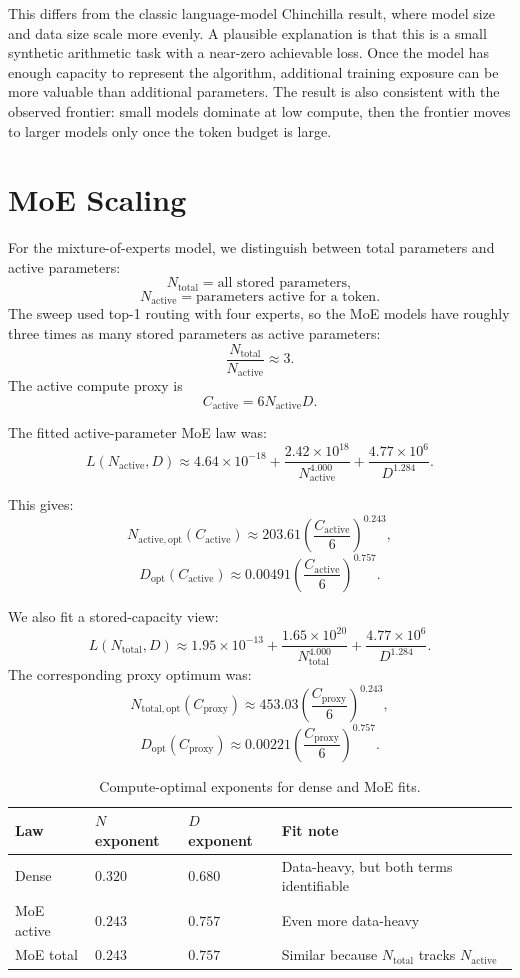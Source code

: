 \documentclass[11pt]{article}
\begin{document}
This differs from the classic language-model Chinchilla result, where model
size and data size scale more evenly. A plausible explanation is that this is
a small synthetic arithmetic task with a near-zero achievable loss. Once the
model has enough capacity to represent the algorithm, additional training
exposure can be more valuable than additional parameters. The result is also
consistent with the observed frontier: small models dominate at low compute,
then the frontier moves to larger models only once the token budget is large.

\section{MoE Scaling}

For the mixture-of-experts model, we distinguish between total parameters and
active parameters:
\[
  N_{\mathrm{total}} = \text{all stored parameters},
\]
\[
  N_{\mathrm{active}} = \text{parameters active for a token}.
\]
The sweep used top-1 routing with four experts, so the MoE models have roughly
three times as many stored parameters as active parameters:
\[
  \frac{N_{\mathrm{total}}}{N_{\mathrm{active}}} \approx 3.
\]
The active compute proxy is
\[
  C_{\mathrm{active}} = 6N_{\mathrm{active}}D.
\]

The fitted active-parameter MoE law was:
\[
  L(N_{\mathrm{active}}, D)
  \approx
  4.64 \times 10^{-18}
  + \frac{2.42 \times 10^{18}}{N_{\mathrm{active}}^{4.000}}
  + \frac{4.77 \times 10^{6}}{D^{1.284}}.
\]

This gives:
\[
  N_{\mathrm{active,opt}}(C_{\mathrm{active}})
  \approx
  203.61 \left(\frac{C_{\mathrm{active}}}{6}\right)^{0.243},
\]
\[
  D_{\mathrm{opt}}(C_{\mathrm{active}})
  \approx
  0.00491 \left(\frac{C_{\mathrm{active}}}{6}\right)^{0.757}.
\]

We also fit a stored-capacity view:
\[
  L(N_{\mathrm{total}}, D)
  \approx
  1.95 \times 10^{-13}
  + \frac{1.65 \times 10^{20}}{N_{\mathrm{total}}^{4.000}}
  + \frac{4.77 \times 10^{6}}{D^{1.284}}.
\]
The corresponding proxy optimum was:
\[
  N_{\mathrm{total,opt}}(C_{\mathrm{proxy}})
  \approx
  453.03 \left(\frac{C_{\mathrm{proxy}}}{6}\right)^{0.243},
\]
\[
  D_{\mathrm{opt}}(C_{\mathrm{proxy}})
  \approx
  0.00221 \left(\frac{C_{\mathrm{proxy}}}{6}\right)^{0.757}.
\]

\begin{table}[h]
\centering
\begin{tabular}{llll}
\toprule
Law & \(N\) exponent & \(D\) exponent & Fit note \\
\midrule
Dense & \(0.320\) & \(0.680\) & Data-heavy, but both terms identifiable \\
MoE active & \(0.243\) & \(0.757\) & Even more data-heavy \\
MoE total & \(0.243\) & \(0.757\) & Similar because \(N_{\mathrm{total}}\) tracks \(N_{\mathrm{active}}\) \\
\bottomrule
\end{tabular}
\caption{Compute-optimal exponents for dense and MoE fits.}
\end{table}
\end{document}
